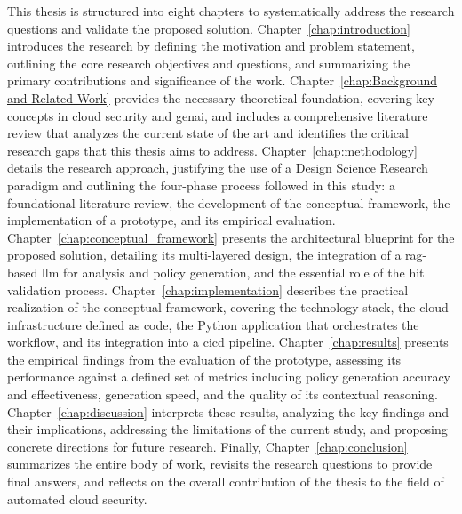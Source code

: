 This thesis is structured into eight chapters to systematically address the research questions and validate the proposed solution. Chapter~\ref{chap:introduction} introduces the research by defining the motivation and problem statement, outlining the core research objectives and questions, and summarizing the primary contributions and significance of the work. Chapter~\ref{chap:Background and Related Work} provides the necessary theoretical foundation, covering key concepts in cloud security and \gls{genai}, and includes a comprehensive literature review that analyzes the current state of the art and identifies the critical research gaps that this thesis aims to address. Chapter~\ref{chap:methodology} details the research approach, justifying the use of a Design Science Research paradigm and outlining the four-phase process followed in this study: a foundational literature review, the development of the conceptual framework, the implementation of a prototype, and its empirical evaluation. Chapter~\ref{chap:conceptual_framework} presents the architectural blueprint for the proposed solution, detailing its multi-layered design, the integration of a \gls{rag}-based \gls{llm} for analysis and policy generation, and the essential role of the \gls{hitl} validation process. Chapter~\ref{chap:implementation} describes the practical realization of the conceptual framework, covering the technology stack, the cloud infrastructure defined as code, the Python application that orchestrates the workflow, and its integration into a \gls{cicd} pipeline. Chapter~\ref{chap:results} presents the empirical findings from the evaluation of the prototype, assessing its performance against a defined set of metrics including policy generation accuracy and effectiveness, generation speed, and the quality of its contextual reasoning. Chapter~\ref{chap:discussion} interprets these results, analyzing the key findings and their implications, addressing the limitations of the current study, and proposing concrete directions for future research. Finally, Chapter~\ref{chap:conclusion} summarizes the entire body of work, revisits the research questions to provide final answers, and reflects on the overall contribution of the thesis to the field of automated cloud security.